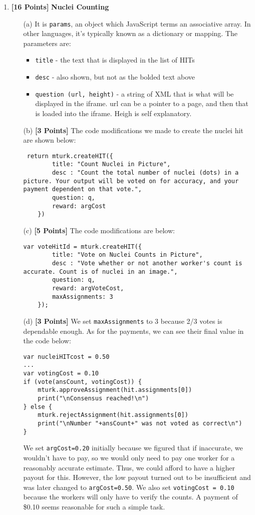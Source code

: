 \documentclass[11pt]{article}
\newcommand{\points}[1]{\textbf{[#1 Points]}}
\begin{document}
\begin{enumerate}
\item \points{16} {\bf Nuclei Counting}

\begin{enumerate}
\item[(a)] 
It is \texttt{params}, an object which JavaScript terms an associative array. In other languages, it's typically known as a dictionary or mapping. The parameters are:
\begin{itemize}
\item \texttt{title} - the text that is displayed in the list of HITs
\item \texttt{desc} - also shown, but not as the bolded text above
\item \texttt{question (url, height)} - a string of XML that is what will be displayed in the iframe. url can be a pointer to a page, and then that is loaded into the iframe. Heigh is self explanatory. 
\end{itemize}
%
\item[(b)] \points{3}
The code modifications we made to create the nuclei hit are shown below:
\begin{lstlisting}
 return mturk.createHIT({
        title: "Count Nuclei in Picture",
        desc : "Count the total number of nuclei (dots) in a picture. Your output will be voted on for accuracy, and your payment dependent on that vote.",
        question: q,
        reward: argCost
    })
\end{lstlisting}

%
\item[(c)] \points{5}
The code modifications are below:
\begin{lstlisting}
var voteHitId = mturk.createHIT({
        title: "Vote on Nuclei Counts in Picture",
        desc : "Vote whether or not another worker's count is accurate. Count is of nuclei in an image.",
        question: q,
        reward: argVoteCost,
        maxAssignments: 3
    });
\end{lstlisting}


\item[(d)] \points{3} We set \texttt{maxAssignments} to 3 because 2/3 votes is dependable enough. As for the payments, we can see their final value in the code below:
\begin{lstlisting}
var nucleiHITcost = 0.50
...
var votingCost = 0.10
if (vote(ansCount, votingCost)) {
    mturk.approveAssignment(hit.assignments[0])
    print("\nConsensus reached!\n")
} else {
    mturk.rejectAssignment(hit.assignments[0])
    print("\nNumber "+ansCount+" was not voted as correct\n")
}    
\end{lstlisting}
We set \texttt{argCost=0.20} initially because we figured that if inaccurate, we wouldn't have to pay, so we would only need to pay one worker for a reasonably accurate estimate. Thus, we could afford to have a higher payout for this. However, the low payout turned out to be insufficient and was later changed to \texttt{argCost=0.50}. We also set \texttt{votingCost = 0.10} because the workers will only have to verify the counts. A payment of \$0.10 seems reasonable for such a simple task.


\end{enumerate}
\end{enumerate}
\end{document}
